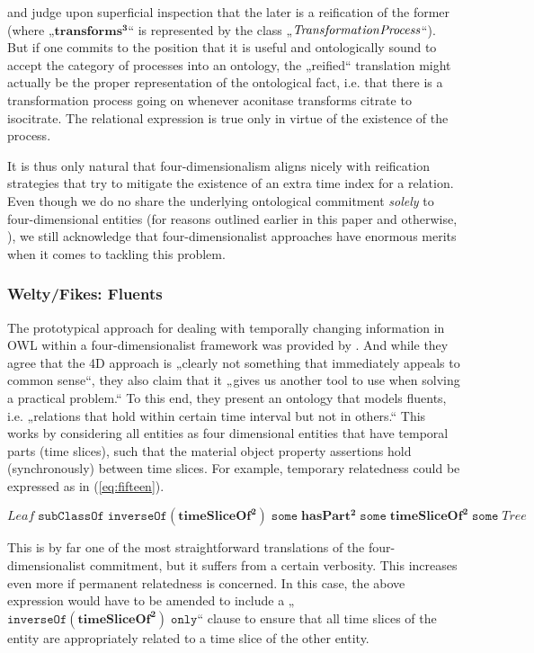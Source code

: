 \documentclass{ao2e}
\newcommand{\mirel}[1]{\ensuremath{\mathrm{\mathbf{#1}}}}
\newcommand{\mclass}[1]{\ensuremath{\mathit{#1}}}
\newcommand{\mrel}[2]{\mirel{#1^#2}}
\newcommand{\mrelb}[1]{\mrel{#1}{2}}
\newcommand{\mrelt}[1]{\mrel{#1}{3}}
\begin{document}
and judge upon superficial inspection that the later is a reification of the
former (where „\mrelt{transforms}“ is represented by the class „\mclass{Trans\-format\-ion\-Process}“). But if one commits to the position that it is useful and
ontologically sound to accept the category of processes into an ontology, the
„reified“ translation might actually be the proper representation of the
ontological fact, i.e. that there is a transformation process going on whenever
aconitase transforms citrate to isocitrate. The relational expression is true
only in virtue of the existence of the process.

It is thus only natural that four-dimensionalism aligns nicely with reification
strategies that try to mitigate the existence of an extra time index for a
relation. Even though we do no share the underlying ontological commitment 
\emph{solely} to four-dimensional entities (for reasons outlined earlier in
this paper and
otherwise, \cite{BFO1:ref}), we still acknowledge that four-dimensionalist
approaches have enormous merits when it comes to tackling this problem.

\subsubsection{Welty/Fikes: Fluents}
The prototypical approach for dealing with temporally changing information in
OWL within a four-dimensionalist framework was provided by 
\cite{Welty:2006}. And while they agree that the 4D  approach is „clearly 
not something that immediately appeals to common sense“, they also claim
that it „gives us another tool to use when solving a practical problem.“ To this
end, they present an ontology that models fluents, i.e. „relations that hold
within certain time interval but not in others.“ This works by considering all
entities as four dimensional entities that have temporal parts (time slices),
such that the material object property assertions hold (synchronously) between
time slices. For example, temporary relatedness could be expressed as in
(\ref{eq:fifteen}).

\begin{equation}
\mclass{Leaf}\;\mathtt{subClassOf}\;\mathtt{inverseOf}(\mrelb{timeSliceOf})\;\mathtt{some}\;
            \mrelb{hasPart}\;\mathtt{some}\;\mrelb{timeSliceOf}\;\mathtt{some}\;\mclass{Tree}
\label{eq:fifteen}
\end{equation}

This is by far one of the most straightforward translations of the
four-dimensionalist commitment, but it suffers from a certain verbosity. This
increases even more if permanent relatedness is concerned. In this case, the
above expression would have to be amended to include a
„$\mathtt{inverseOf}(\mrelb{timeSliceOf})\;\mathtt{only}$“ clause to ensure that
all time slices of the entity are appropriately related to a time slice of the
other entity.
\end{document}
